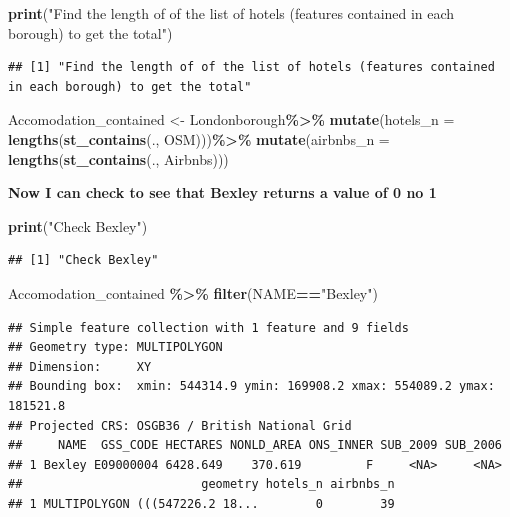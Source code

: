 \documentclass[
]{article}
\newenvironment{Shaded}{\begin{snugshade}}{\end{snugshade}}
\newcommand{\AttributeTok}[1]{\textcolor[rgb]{0.13,0.29,0.53}{#1}}
\newcommand{\FunctionTok}[1]{\textcolor[rgb]{0.13,0.29,0.53}{\textbf{#1}}}
\newcommand{\NormalTok}[1]{#1}
\newcommand{\OtherTok}[1]{\textcolor[rgb]{0.56,0.35,0.01}{#1}}
\newcommand{\SpecialCharTok}[1]{\textcolor[rgb]{0.81,0.36,0.00}{\textbf{#1}}}
\newcommand{\StringTok}[1]{\textcolor[rgb]{0.31,0.60,0.02}{#1}}
\begin{document}
\begin{Shaded}
\begin{Highlighting}[]
\FunctionTok{print}\NormalTok{(}\StringTok{"Find the length of of the list of hotels (features contained in each borough) to get the total"}\NormalTok{)}
\end{Highlighting}
\end{Shaded}

\begin{verbatim}
## [1] "Find the length of of the list of hotels (features contained in each borough) to get the total"
\end{verbatim}

\begin{Shaded}
\begin{Highlighting}[]
\NormalTok{Accomodation\_contained }\OtherTok{\textless{}{-}}\NormalTok{ Londonborough}\SpecialCharTok{\%\textgreater{}\%}
  \FunctionTok{mutate}\NormalTok{(}\AttributeTok{hotels\_n =} \FunctionTok{lengths}\NormalTok{(}\FunctionTok{st\_contains}\NormalTok{(., OSM)))}\SpecialCharTok{\%\textgreater{}\%}
  \FunctionTok{mutate}\NormalTok{(}\AttributeTok{airbnbs\_n =} \FunctionTok{lengths}\NormalTok{(}\FunctionTok{st\_contains}\NormalTok{(., Airbnbs)))}
\end{Highlighting}
\end{Shaded}

\textbf{Now I can check to see that Bexley returns a value of 0 no 1}

\begin{Shaded}
\begin{Highlighting}[]
\FunctionTok{print}\NormalTok{(}\StringTok{"Check Bexley"}\NormalTok{)}
\end{Highlighting}
\end{Shaded}

\begin{verbatim}
## [1] "Check Bexley"
\end{verbatim}

\begin{Shaded}
\begin{Highlighting}[]
\NormalTok{Accomodation\_contained }\SpecialCharTok{\%\textgreater{}\%}
  \FunctionTok{filter}\NormalTok{(NAME}\SpecialCharTok{==}\StringTok{"Bexley"}\NormalTok{)}
\end{Highlighting}
\end{Shaded}

\begin{verbatim}
## Simple feature collection with 1 feature and 9 fields
## Geometry type: MULTIPOLYGON
## Dimension:     XY
## Bounding box:  xmin: 544314.9 ymin: 169908.2 xmax: 554089.2 ymax: 181521.8
## Projected CRS: OSGB36 / British National Grid
##     NAME  GSS_CODE HECTARES NONLD_AREA ONS_INNER SUB_2009 SUB_2006
## 1 Bexley E09000004 6428.649    370.619         F     <NA>     <NA>
##                         geometry hotels_n airbnbs_n
## 1 MULTIPOLYGON (((547226.2 18...        0        39
\end{verbatim}
\end{document}
